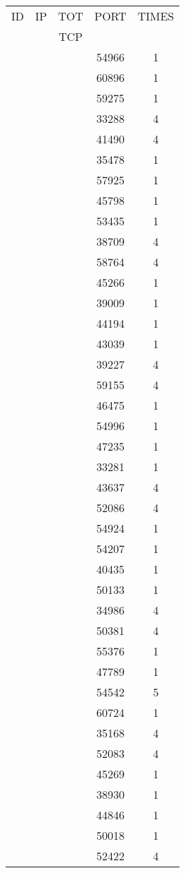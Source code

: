 \documentclass[a4paper]{scrartcl}
\begin{document}
\begin{minipage}[b]{0.5\linewidth}
\begin{tabular}{| c | c | c | c | c |}
\hline
ID & IP & TOT & PORT & TIMES \\ 
   &    & TCP &      &       \\ 
\hline
& & & 54966 & 1 \\ & & & 60896 & 1 \\ & & & 59275 & 1 \\ & & & 33288 & 4 \\ & & & 41490 & 4 \\ & & & 35478 & 1 \\ & & & 57925 & 1 \\ & & & 45798 & 1 \\ & & & 53435 & 1 \\ & & & 38709 & 4 \\ & & & 58764 & 4 \\ & & & 45266 & 1 \\ & & & 39009 & 1 \\ & & & 44194 & 1 \\ & & & 43039 & 1 \\ & & & 39227 & 4 \\ & & & 59155 & 4 \\ & & & 46475 & 1 \\ & & & 54996 & 1 \\ & & & 47235 & 1 \\ & & & 33281 & 1 \\ & & & 43637 & 4 \\ & & & 52086 & 4 \\ & & & 54924 & 1 \\ & & & 54207 & 1 \\ & & & 40435 & 1 \\ & & & 50133 & 1 \\ & & & 34986 & 4 \\ & & & 50381 & 4 \\ & & & 55376 & 1 \\ & & & 47789 & 1 \\ & & & 54542 & 5 \\ & & & 60724 & 1 \\ & & & 35168 & 4 \\ & & & 52083 & 4 \\ & & & 45269 & 1 \\ & & & 38930 & 1 \\ & & & 44846 & 1 \\ & & & 50018 & 1 \\ & & & 52422 & 4 \\ \hline\end{tabular}\end{minipage} \hfill\begin{minipage}[b]{0.5\linewidth}\begin{tabular}{| c | c | c | c | c |}

\end{tabular}
\end{minipage}
\end{document}
